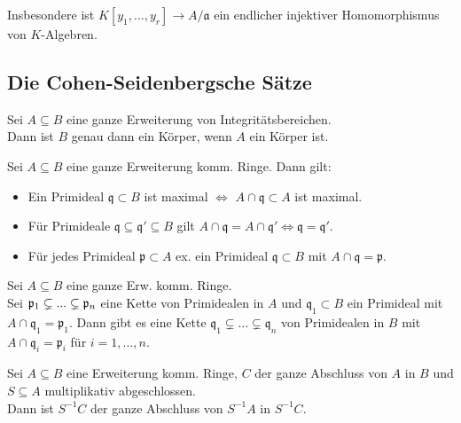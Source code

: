 \documentclass{cheat-sheet}
\newcommand{\aaa}{\mathfrak{a}}
\newcommand{\ppp}{\mathfrak{p}}
\newcommand{\qqq}{\mathfrak{q}}
\begin{document}
\begin{bem}
  Insbesondere ist $K[y_1, \ldots, y_r] \to A/\aaa$ ein endlicher injektiver Homomorphismus von $K$-Algebren.
\end{bem}

\subsection{Die Cohen-Seidenbergsche Sätze}


\begin{prop}
  Sei $A \subseteq B$ eine ganze Erweiterung von Integritätsbereichen. \\
  Dann ist $B$ genau dann ein Körper, wenn $A$ ein Körper ist.
\end{prop}

\begin{prop}
  Sei $A \subseteq B$ eine ganze Erweiterung komm. Ringe.
  Dann gilt:
  \begin{itemize}
    \item Ein Primideal $\qqq \subset B$ ist maximal $\iff$ $A \cap \qqq \subset A$ ist maximal.
    \item Für Primideale $\qqq \subseteq \qqq' \subseteq B$ gilt $A \cap \qqq = A \cap \qqq' \iff \qqq = \qqq'$.
    \item Für jedes Primideal $\ppp \subset A$ ex. ein Primideal $\qqq \subset B$ mit $A \cap \qqq = \ppp$.
  \end{itemize}
\end{prop}

\begin{satz}
  Sei $A \subseteq B$ eine ganze Erw. komm. Ringe. \\
  Sei $\ppp_1 \subsetneq \nldots \subsetneq \ppp_n$ eine Kette von Primidealen in $A$ und $\qqq_1 \subset B$ ein Primideal mit $A \cap \qqq_1 = \ppp_1$.
  Dann gibt es eine Kette $\qqq_1 \subsetneq \ldots \subsetneq \qqq_n$ von Primidealen in $B$ mit $A \cap \qqq_i = \ppp_i$ für $i = 1, \ldots, n$.
\end{satz}



\begin{prop}
  Sei $A \subseteq B$ eine Erweiterung komm. Ringe,
  $C$ der ganze Abschluss von $A$ in $B$ und
  $S \subseteq A$ multiplikativ abgeschlossen. \\
  Dann ist $S^{-1} C$ der ganze Abschluss von $S^{-1} A$ in $S^{-1} C$.
\end{prop}
\end{document}
